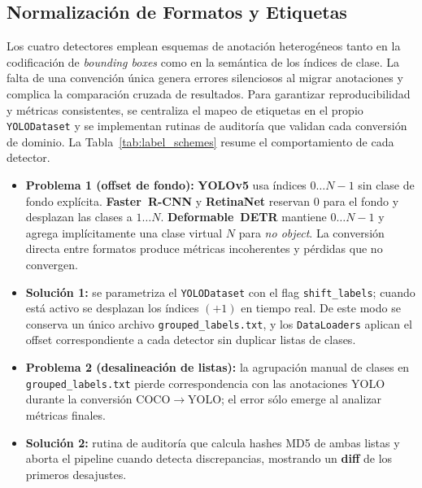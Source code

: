 \subsection{Normalización de Formatos y Etiquetas}\label{ssec:label_norm}

Los cuatro detectores emplean esquemas de anotación heterogéneos tanto en la codificación de \emph{bounding boxes} como en la semántica de los índices de clase.
La falta de una convención única genera errores silenciosos al migrar anotaciones y complica la comparación cruzada de resultados.
Para garantizar reproducibilidad y métricas consistentes, se centraliza el mapeo de etiquetas en el propio \texttt{YOLODataset} y se implementan rutinas de auditoría que validan cada conversión de dominio.
La Tabla~\ref{tab:label_schemes} resume el comportamiento de cada detector.

\begin{itemize}
   \item \textbf{Problema 1 (offset de fondo):}
         \textbf{YOLOv5} usa índices \(0\dots N{-}1\) sin clase de fondo explícita.
         \textbf{Faster~R-CNN} y \textbf{RetinaNet} reservan \(0\) para el fondo y desplazan las clases a \(1\dots N\).
         \textbf{Deformable~DETR} mantiene \(0\dots N{-}1\) y agrega implícitamente una clase virtual \(N\) para \textit{no object}.
         La conversión directa entre formatos produce métricas incoherentes y pérdidas que no convergen.
   \item \textbf{Solución 1:}
         se parametriza el \texttt{YOLODataset} con el flag \texttt{shift\_labels}; cuando está activo se desplazan los índices \((+1)\) en tiempo real.
         De este modo se conserva un único archivo \texttt{grouped\_labels.txt}, y los \texttt{DataLoaders} aplican el offset correspondiente a cada detector sin duplicar listas de clases.
   \item \textbf{Problema 2 (desalineación de listas):}
         la agrupación manual de clases en \texttt{grouped\_labels.txt} pierde correspondencia con las anotaciones YOLO durante la conversión COCO\(\rightarrow\)YOLO; el error sólo emerge al analizar métricas finales.
   \item \textbf{Solución 2:}
         rutina de auditoría que calcula hashes MD5 de ambas listas y aborta el pipeline cuando detecta discrepancias, mostrando un \textbf{diff} de los primeros desajustes.
\end{itemize}

